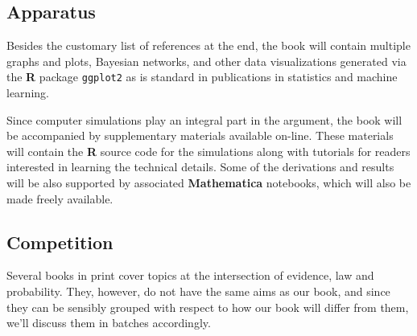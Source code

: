 \documentclass[
  10pt,
  dvipsnames,enabledeprecatedfontcommands]{scrartcl}
\begin{document}
\hypertarget{apparatus}{%
\subsection{Apparatus}\label{apparatus}}

\vspace{-2mm}

Besides the customary list of references at the end, the book will
contain multiple graphs and plots, Bayesian networks, and other data
visualizations generated via the \textbf{\textsf{R}} package
\texttt{ggplot2} as is standard in publications in statistics and
machine learning.

Since computer simulations play an integral part in the argument, the
book will be accompanied by supplementary materials available on-line.
These materials will contain the \textbf{\textsf{R}} source code for the
simulations along with tutorials for readers interested in learning the
technical details. Some of the derivations and results will be also
supported by associated \textbf{\textsf{Mathematica}} notebooks, which
will also be made freely available.

\hypertarget{competition}{%
\subsection{Competition}\label{competition}}

\normalsize

Several books in print cover topics at the intersection of evidence, law
and probability. They, however, do not have the same aims as our book,
and since they can be sensibly grouped with respect to how our book will
differ from them, we'll discuss them in batches accordingly.

\end{document}
